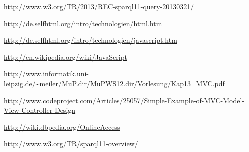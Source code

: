 \begin{thebibliography}{99}

\url{http://www.w3.org/TR/2013/REC-sparql11-query-20130321/}

\url{http://de.selfhtml.org/intro/technologien/html.htm}


\url{http://de.selfhtml.org/intro/technologien/javascript.htm}

\url{http://en.wikipedia.org/wiki/JavaScript}

\url{http://www.informatik.uni-leipzig.de/~meiler/MuP.dir/MuPWS12.dir/Vorlesung/Kap13_MVC.pdf}

\href{http://www.codeproject.com/Articles/25057/Simple-Example-of-MVC-Model-View-Controller-Design}{\url{http://www.codeproject.com/Articles/25057/Simple-Example-of-MVC-}\break\url{Model-View-Controller-Design}}



\url{http://wiki.dbpedia.org/OnlineAccess}


\url{http://www.w3.org/TR/sparql11-overview/}



\end{thebibliography}

